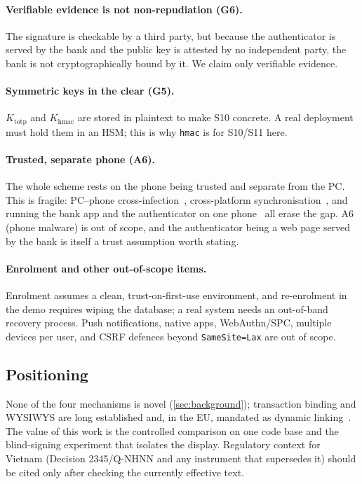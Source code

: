 \paragraph{Verifiable evidence is not non-repudiation (G6).}
The signature is checkable by a third party, but because the authenticator is
served by the bank and the public key is attested by no independent party, the
bank is not cryptographically bound by it. We claim only verifiable evidence.

\paragraph{Symmetric keys in the clear (G5).}
$K_{\text{totp}}$ and $K_{\text{hmac}}$ are stored in plaintext to make S10
concrete. A real deployment must hold them in an HSM; this is why \texttt{hmac}
is \xmark{} for S10/S11 here.

\paragraph{Trusted, separate phone (A6).}
The whole scheme rests on the phone being trusted and separate from the PC. This
is fragile: PC--phone cross-infection~\cite{dmitrienko2014}, cross-platform
synchronisation~\cite{konoth2016}, and running the bank app and the authenticator
on one phone~\cite{haupert2018} all erase the gap. A6 (phone malware) is out of
scope, and the authenticator being a web page served by the bank is itself a
trust assumption worth stating.

\paragraph{Enrolment and other out-of-scope items.}
Enrolment assumes a clean, trust-on-first-use environment, and re-enrolment in
the demo requires wiping the database; a real system needs an out-of-band
recovery process. Push notifications, native apps, WebAuthn/SPC, multiple devices
per user, and CSRF defences beyond \texttt{SameSite=Lax} are out of scope.

\subsection{Positioning}
None of the four mechanisms is novel (\cref{sec:background}); transaction binding
and WYSIWYS are long established and, in the EU, mandated as dynamic
linking~\cite{eu2018389}. The value of this work is the controlled comparison on
one code base and the blind-signing experiment that isolates the display.
Regulatory context for Vietnam (Decision 2345/Q\DJ-NHNN and any instrument that
supersedes it) should be cited only after checking the currently effective text.
